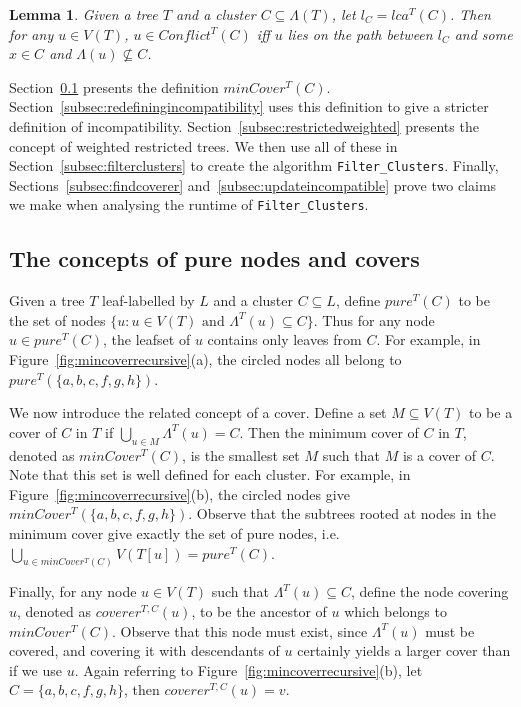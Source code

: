 \documentclass[final,1p,times]{elsarticle}
\newcommand{\leafset}{\Lambda}
\newtheorem{lemma}[theorem]{Lemma}
\begin{document}
    \begin{lemma}
        \label{lem:incompatibility}
        Given a tree $T$ and a cluster $C \subseteq \leafset(T)$, let $l_C = lca^T(C)$. Then for any $u \in V(T)$, $u \in Conflict^{T}(C)$ iff $u$ lies on the path between $l_C$ and some $x \in C$ and $\leafset(u) \not\subseteq C$.
    \end{lemma}


    Section~\ref{subsec:mincover} presents the definition $minCover^{T}(C)$. Section~\ref{subsec:redefiningincompatibility} uses this definition to give a stricter definition of incompatibility. Section~\ref{subsec:restrictedweighted} presents the concept of weighted restricted trees. We then use all of these in Section~\ref{subsec:filterclusters} to create the algorithm \texttt{Filter\_Clusters}. Finally, Sections~\ref{subsec:findcoverer} and~\ref{subsec:updateincompatible} prove two claims we make when analysing the runtime of \texttt{Filter\_Clusters}.

    \subsection{The concepts of pure nodes and covers}
    \label{subsec:mincover}

    Given a tree $T$ leaf-labelled by $L$ and a cluster $C \subseteq L$, define $pure^{T}(C)$ to be the set of nodes $\{u : u \in V(T) \text{ and } \leafset^{T}(u) \subseteq C\}$. Thus for any node $u \in pure^{T}(C)$, the leafset of $u$ contains only leaves from $C$. For example, in Figure~\ref{fig:mincoverrecursive}(a), the circled nodes all belong to $pure^{T}(\{a, b, c, f, g, h\})$.

    We now introduce the related concept of a cover. Define a set $M \subseteq V(T)$ to be a cover of $C$ in $T$ if $\bigcup_{u \in M} \leafset^{T}(u) = C$. Then the minimum cover of $C$ in $T$, denoted as $minCover^{T}(C)$, is the smallest set $M$ such that $M$ is a cover of $C$. Note that this set is well defined for each cluster. For example, in Figure~\ref{fig:mincoverrecursive}(b), the circled nodes give $minCover^{T}(\{a, b, c, f, g, h\})$. Observe that the subtrees rooted at nodes in the minimum cover give exactly the set of pure nodes, i.e. $\bigcup_{u \in minCover^{T}(C)} V(T[u]) = pure^{T}(C)$.

    Finally, for any node $u \in V(T)$ such that $\leafset^{T}(u) \subseteq C$, define the node covering $u$, denoted as $coverer^{T, C}(u)$, to be the ancestor of $u$ which belongs to $minCover^{T}(C)$. Observe that this node must exist, since $\leafset^{T}(u)$ must be covered, and covering it with descendants of $u$ certainly yields a larger cover than if we use $u$. Again referring to Figure~\ref{fig:mincoverrecursive}(b), let $C = \{a, b, c, f, g, h\}$, then $coverer^{T, C}(u) = v$.
\end{document}
